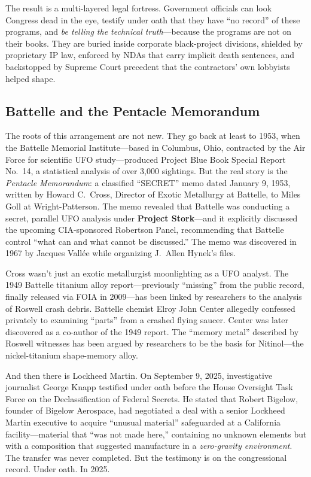 \documentclass[11pt,a4paper]{article}
\begin{document}
The result is a multi-layered legal fortress. Government officials can look Congress dead in the eye, testify under oath that they have ``no record'' of these programs, and \textit{be telling the technical truth}---because the programs are not on their books. They are buried inside corporate black-project divisions, shielded by proprietary IP law, enforced by NDAs that carry implicit death sentences, and backstopped by Supreme Court precedent that the contractors' own lobbyists helped shape.

\subsection{Battelle and the Pentacle Memorandum}

The roots of this arrangement are not new. They go back at least to 1953, when the Battelle Memorial Institute---based in Columbus, Ohio, contracted by the Air Force for scientific UFO study---produced Project Blue Book Special Report No.\ 14, a statistical analysis of over 3,000 sightings. But the real story is the \textit{Pentacle Memorandum}: a classified ``SECRET'' memo dated January 9, 1953, written by Howard C.\ Cross, Director of Exotic Metallurgy at Battelle, to Miles Goll at Wright-Patterson. The memo revealed that Battelle was conducting a secret, parallel UFO analysis under \textbf{Project Stork}---and it explicitly discussed the upcoming CIA-sponsored Robertson Panel, recommending that Battelle control ``what can and what cannot be discussed.'' The memo was discovered in 1967 by Jacques Vall\'{e}e while organizing J.\ Allen Hynek's files.

Cross wasn't just an exotic metallurgist moonlighting as a UFO analyst. The 1949 Battelle titanium alloy report---previously ``missing'' from the public record, finally released via FOIA in 2009---has been linked by researchers to the analysis of Roswell crash debris. Battelle chemist Elroy John Center allegedly confessed privately to examining ``parts'' from a crashed flying saucer. Center was later discovered as a co-author of the 1949 report. The ``memory metal'' described by Roswell witnesses has been argued by researchers to be the basis for Nitinol---the nickel-titanium shape-memory alloy.

And then there is Lockheed Martin. On September 9, 2025, investigative journalist George Knapp testified under oath before the House Oversight Task Force on the Declassification of Federal Secrets. He stated that Robert Bigelow, founder of Bigelow Aerospace, had negotiated a deal with a senior Lockheed Martin executive to acquire ``unusual material'' safeguarded at a California facility---material that ``was not made here,'' containing no unknown elements but with a composition that suggested manufacture in a \textit{zero-gravity environment}. The transfer was never completed. But the testimony is on the congressional record. Under oath. In 2025.
\end{document}
